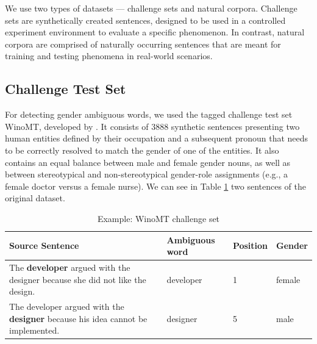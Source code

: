 
We use two types of datasets — challenge sets and natural corpora. Challenge sets are synthetically created sentences, designed to be used in a controlled experiment environment to evaluate a specific phenomenon. In contrast, natural corpora are comprised of naturally occurring sentences that are meant for training and testing phenomena in real-world scenarios.

\subsection{Challenge Test Set}
\label{sec:Experiments:Challenge_Set}

For detecting gender ambiguous words, we used the tagged challenge test set WinoMT, developed by \citet{Stanovsky_2019}. It consists of 3888 synthetic sentences presenting two human entities defined by their occupation and a subsequent pronoun that needs to be correctly resolved to match the gender of one of the entities. It also contains an equal balance between male and female gender nouns, as well as between stereotypical and non-stereotypical gender-role assignments (e.g., a female doctor versus a female nurse). We can see in Table \ref{tab:winomt} two sentences of the original dataset.


\begin{table}
    \label{tab:winomt}
    \begin{tabularx}{\linewidth}{|X|l|l|l|}
        \hline
        \textbf{Source Sentence} & \textbf{Ambiguous word} & \textbf{Position} & \textbf{Gender} \\ \hline
        The \textbf{developer} argued with the designer because she did not like the design. & developer & 1 & female \\ \hline
        The developer argued with the \textbf{designer} because his idea cannot be implemented. & designer & 5 & male \\ \hline
    \end{tabularx}
    \caption{Example: WinoMT challenge set}
\end{table}

